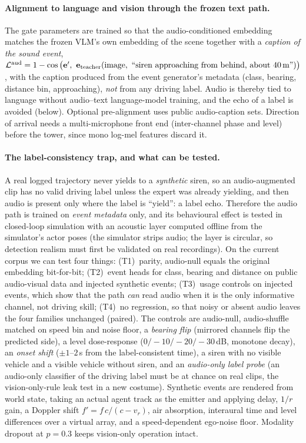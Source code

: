 \paragraph{Alignment to language and vision through the frozen text path.}
The gate parameters are trained so that the audio-conditioned embedding matches the frozen VLM's own embedding of the scene together with a \emph{caption of the sound event},
$\mathcal L^{\text{aud}}=1-\cos\big(\mathbf e',\ \mathbf e_{\text{teacher}}(\text{image},\ \text{``siren approaching from behind, about 40\,m''})\big)$,
with the caption produced from the event generator's metadata (class, bearing, distance bin, approaching), \emph{not} from any driving label. Audio is thereby tied to language without audio--text language-model training, and the echo of a label is avoided (below). Optional pre-alignment uses public audio-caption sets. Direction of arrival needs a multi-microphone front end (inter-channel phase and level) before the tower, since mono log-mel features discard it.

\paragraph{The label-consistency trap, and what can be tested.}
A real logged trajectory never yields to a \emph{synthetic} siren, so an audio-augmented clip has no valid driving label unless the expert was already yielding, and then audio is present only where the label is ``yield'': a label echo. Therefore the audio path is trained on \emph{event metadata} only, and its behavioural effect is tested in closed-loop simulation with an acoustic layer computed offline from the simulator's actor poses (the simulator strips audio; the layer is circular, so detection realism must first be validated on real recordings).
On the current corpus we can test four things: (T1)~parity, audio-null equals the original embedding bit-for-bit; (T2)~event heads for class, bearing and distance on public audio-visual data and injected synthetic events; (T3)~usage controls on injected events, which show that the path \emph{can} read audio when it is the only informative channel, not driving skill; (T4)~no regression, so that noisy or absent audio leaves the four families unchanged (paired).
The controls are audio-null, audio-shuffle matched on speed bin and noise floor, a \emph{bearing flip} (mirrored channels flip the predicted side), a level dose-response ($0/-10/-20/-30$\,dB, monotone decay), an \emph{onset shift} ($\pm1$--$2$\,s from the label-consistent time), a siren with no visible vehicle and a visible vehicle without siren, and an \emph{audio-only label probe} (an audio-only classifier of the driving label must be at chance on real clips, the vision-only-rule leak test in a new costume). Synthetic events are rendered from world state, taking an actual agent track as the emitter and applying delay, $1/r$ gain, a Doppler shift $f'=f\,c/(c-v_r)$, air absorption, interaural time and level differences over a virtual array, and a speed-dependent ego-noise floor.
Modality dropout at $p=0.3$ keeps vision-only operation intact.

